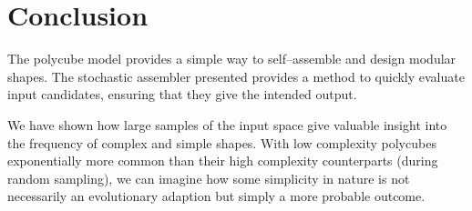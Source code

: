 






\section{Conclusion}
The polycube model provides a simple way to self--assemble and design modular shapes. The stochastic assembler presented provides a method to quickly evaluate input candidates, ensuring that they give the intended output.

We have shown how large samples of the input space give valuable insight into the frequency of complex and simple shapes. With low complexity polycubes exponentially more common than their high complexity counterparts (during random sampling), we can imagine how some simplicity in nature is not necessarily an evolutionary adaption but simply a more probable outcome.